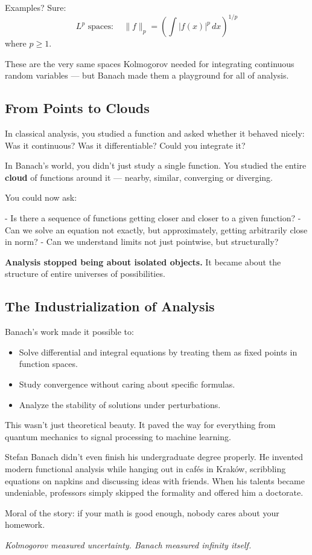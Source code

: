 Examples?  
Sure:
\[
L^p \text{ spaces}: \quad \|f\|_p = \left( \int |f(x)|^p \, dx \right)^{1/p}
\]
where \( p \geq 1 \).

These are the very same spaces Kolmogorov needed for integrating continuous random variables — but Banach made them a playground for all of analysis.

\subsection*{From Points to Clouds}

In classical analysis, you studied a function and asked whether it behaved nicely:  
Was it continuous? Was it differentiable? Could you integrate it?

In Banach’s world, you didn’t just study a single function.  
You studied the entire \textbf{cloud} of functions around it — nearby, similar, converging or diverging.

You could now ask:

- Is there a sequence of functions getting closer and closer to a given function?
- Can we solve an equation not exactly, but approximately, getting arbitrarily close in norm?
- Can we understand limits not just pointwise, but structurally?

\smallskip

\textbf{Analysis stopped being about isolated objects.}  
It became about the structure of entire universes of possibilities.

\subsection*{The Industrialization of Analysis}

Banach’s work made it possible to:

\begin{itemize}
    \item Solve differential and integral equations by treating them as fixed points in function spaces.
    \item Study convergence without caring about specific formulas.
    \item Analyze the stability of solutions under perturbations.
\end{itemize}

This wasn’t just theoretical beauty.  
It paved the way for everything from quantum mechanics to signal processing to machine learning.

\begin{tcolorbox}[title=Historical Sidebar: The Café Where Functional Analysis Was Born, colback=gray!5!white, colframe=black!80!white, fonttitle=\bfseries]

  Stefan Banach didn’t even finish his undergraduate degree properly.  
  He invented modern functional analysis while hanging out in cafés in Kraków, scribbling equations on napkins and discussing ideas with friends.  
  When his talents became undeniable, professors simply skipped the formality and offered him a doctorate.

  Moral of the story: if your math is good enough, nobody cares about your homework.
  
\end{tcolorbox}

\vspace{1em}

\begin{center}
\textit{Kolmogorov measured uncertainty. Banach measured infinity itself.}
\end{center}
